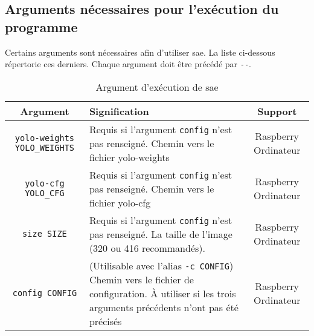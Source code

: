 \subsection{Arguments nécessaires pour l'exécution du programme}
\label{sec:executionArg_clearWay}
Certains arguments sont nécessaires afin d'utiliser \gls{sae}. La liste ci-dessous répertorie ces derniers.
Chaque argument doit être précédé par \verb=--=.
\begin{table}[H]
    \centering
    \begin{tabularx}{\linewidth}{|c|X|c|}
        \hline
        \rowcolor{tableColorDark} Argument & Signification & Support   \\
        \hline
        \verb=yolo-weights YOLO_WEIGHTS=     & Requis si l'argument \verb=config= n'est pas renseigné. Chemin vers le fichier yolo-weights                                                                   & Raspberry Ordinateur    \\\hline
        \verb=yolo-cfg YOLO_CFG=             & Requis si l'argument \verb=config= n'est pas renseigné. Chemin vers le fichier yolo-cfg                                                                       & Raspberry Ordinateur    \\\hline
        \verb=size SIZE=                      & Requis si l'argument \verb=config= n'est pas renseigné. La taille de l'image (320 ou 416 recommandés).                                                       & Raspberry Ordinateur    \\\hline
        \verb=config CONFIG=                  & (Utilisable avec l'alias \verb=-c CONFIG=) Chemin vers le fichier de configuration. À utiliser si les trois arguments précédents n'ont pas été précisés      & Raspberry Ordinateur    \\\hline
    \end{tabularx}
    \label{tab:ArgClearway}
    \caption{Argument d'exécution de \gls{sae}}
\end{table}

